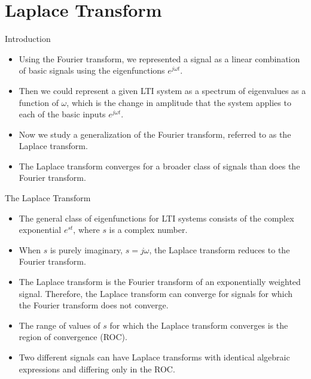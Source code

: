 \section{Laplace Transform}
\begin{frame}{Introduction}
    \begin{itemize}
        \item Using the Fourier transform, we represented a signal as a linear combination of basic signals using the eigenfunctions $e^{j\omega t}$.
        \item Then we could represent a given LTI system as a spectrum of eigenvalues as a function of $\omega$, which is the change in amplitude that the system applies to each of the basic inputs  $e^{j\omega t}$.
        \item Now we study a generalization of the Fourier transform, referred to as the Laplace transform.
        \item The Laplace transform converges for a broader class of signals than does the Fourier transform.
    \end{itemize}
\end{frame}


\begin{frame}{The Laplace Transform}
    \begin{itemize}
        \item The general class of eigenfunctions for LTI systems consists of the complex exponential $e^{st}$, where $s$ is a complex number.
        \item When $s$ is purely imaginary, $s= j\omega$, the Laplace transform reduces to the Fourier transform.
        \item The Laplace transform is the Fourier transform of an exponentially weighted signal. Therefore, the Laplace transform can converge for signals for which the Fourier transform does not converge.
        \item The range of values of $s$  for which the Laplace transform converges is the \alert{region of convergence} (ROC).
        \item Two different signals can have Laplace transforms with identical algebraic expressions and differing only in the ROC.
    \end{itemize}
\end{frame}

